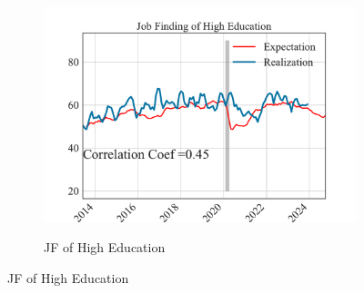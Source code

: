 \begin{figure}[pt]
    \begin{subfigure}{0.32\linewidth}
        \centering
        \caption{JF of High Education}
        \includegraphics[width=\linewidth]{text/chapter2/Figures/expectation_realization_comparison_JF_HighEdu.pdf} 
        \label{fig:subfig3}
    \end{subfigure}


\end{figure}
